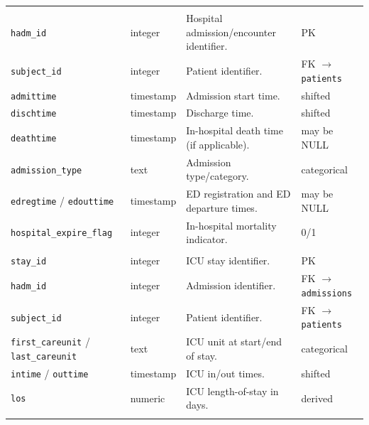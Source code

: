 \documentclass[12pt]{article}
\begin{document}
\begin{longtable}{@{}
L{0.30\textwidth}
L{0.12\textwidth}
L{0.45\textwidth}
L{0.15\textwidth}
@{}}
\\
\texttt{hadm\_id} & integer & Hospital admission/encounter identifier. & PK \\
\texttt{subject\_id} & integer & Patient identifier. & FK $\rightarrow$ \texttt{patients} \\
\texttt{admittime} & timestamp & Admission start time. & shifted \\
\texttt{dischtime} & timestamp & Discharge time. & shifted \\
\texttt{deathtime} & timestamp & In-hospital death time (if applicable). & may be NULL \\
\texttt{admission\_type} & text & Admission type/category. & categorical \\
\texttt{edregtime} / \texttt{edouttime} & timestamp & ED registration and ED departure times. & may be NULL \\
\texttt{hospital\_expire\_flag} & integer & In-hospital mortality indicator. & 0/1 \\

\addlinespace[0.9em]

\\
\texttt{stay\_id} & integer & ICU stay identifier. & PK \\
\texttt{hadm\_id} & integer & Admission identifier. & FK $\rightarrow$ \texttt{admissions} \\
\texttt{subject\_id} & integer & Patient identifier. & FK $\rightarrow$ \texttt{patients} \\
\texttt{first\_careunit} / \texttt{last\_careunit} & text & ICU unit at start/end of stay. & categorical \\
\texttt{intime} / \texttt{outtime} & timestamp & ICU in/out times. & shifted \\
\texttt{los} & numeric & ICU length-of-stay in days. & derived \\

\addlinespace[0.9em]


\end{longtable}
\end{document}
